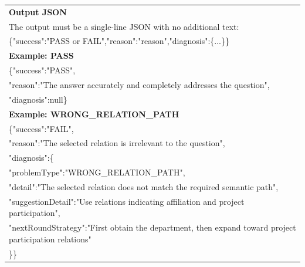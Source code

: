 {\begin{longtable}{@{}p{}@{}}
\textbf{Output JSON}
\\

The output must be a single-line JSON with no additional text:
\\

{\ttfamily
\{"success":"PASS or FAIL","reason":"reason","diagnosis":\{...\}\}
}
\\



\textbf{Example: PASS}
\\

{\ttfamily
\{"success":"PASS",
}
\\

{\ttfamily
"reason":"The answer accurately and completely addresses the question",
}
\\

{\ttfamily
"diagnosis":null\}
}
\\



\textbf{Example: WRONG\_RELATION\_PATH}
\\

{\ttfamily
\{"success":"FAIL",
}
\\

{\ttfamily
"reason":"The selected relation is irrelevant to the question",
}
\\

{\ttfamily
"diagnosis":\{
}
\\

{\ttfamily
"problemType":"WRONG\_RELATION\_PATH",
}
\\

{\ttfamily
"detail":"The selected relation does not match the required semantic path",
}
\\

{\ttfamily
"suggestionDetail":"Use relations indicating affiliation and project participation",
}
\\

{\ttfamily
"nextRoundStrategy":"First obtain the department, then expand toward project participation relations"
}
\\

{\ttfamily
\}\}
}
\\




\end{longtable}}
